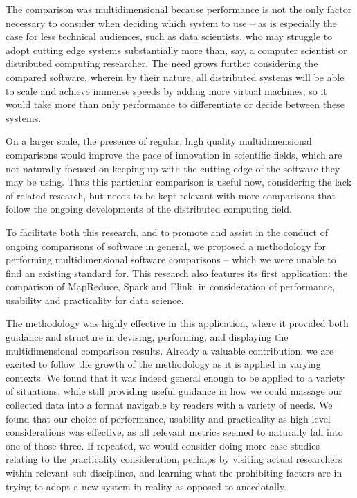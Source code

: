   The comparison was multidimensional because performance is not the only factor necessary to consider when deciding which system to use -- as is especially the case for less technical audiences, such as data scientists, who may struggle to adopt cutting edge systems substantially more than, say, a computer scientist or distributed computing researcher. The need grows further considering the compared software, wherein by their nature, all distributed systems will be able to scale and achieve immense speeds by adding more virtual machines; so it would take more than only performance to differentiate or decide between these systems.
  
  On a larger scale, the presence of regular, high quality multidimensional comparisons would improve the pace of innovation in scientific fields, which are not naturally focused on keeping up with the cutting edge of the software they may be using. Thus this particular comparison is useful now, considering the lack of related research, but needs to be kept relevant with more comparisons that follow the ongoing developments of the distributed computing field.

  To facilitate both this research, and to promote and assist in the conduct of ongoing comparisons of software in general, we proposed a methodology for performing multidimensional software comparisons -- which we were unable to find an existing standard for. This research also features its first application: the comparison of MapReduce, Spark and Flink, in consideration of performance, usability and practicality for data science.

  The methodology was highly effective in this application, where it provided both guidance and structure in devising, performing, and displaying the multidimensional comparison results. Already a valuable contribution, we are excited to follow the growth of the methodology as it is applied in varying contexts. We found that it was indeed general enough to be applied to a variety of situations, while still providing useful guidance in how we could massage our collected data into a format navigable by readers with a variety of needs. We found that our choice of performance, usability and practicality as high-level considerations was effective, as all relevant metrics seemed to naturally fall into one of those three. If repeated, we would consider doing more case studies relating to the practicality consideration, perhaps by visiting actual researchers within relevant sub-disciplines, and learning what the prohibiting factors are in trying to adopt a new system in reality as opposed to anecdotally.

